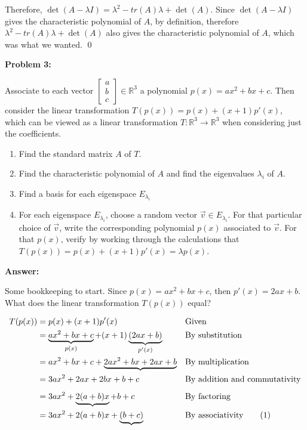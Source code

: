 \documentclass[10pt,letterpaper,final]{report}
\newcommand{\reason}[1]{&& \text{#1}}
\begin{document}
Therefore, $\det (A - \lambda I) = \lambda^2 - tr(A) \lambda + \det(A)$. Since $\det (A - \lambda I)$ gives the characteristic polynomial of $A$, by definition, therefore $\lambda^2 - tr(A) \lambda + \det(A)$ also gives the characteristic polynomial of $A$, which was what we wanted. \qed


\pagebreak

\noindent\textbf{Problem 3:}
\medskip

Associate to each vector $\begin{bmatrix}a\\b\\c\end{bmatrix} \in \mathbb{R}^3$ a polynomial $p(x) = ax^2 + bx + c$. Then consider the linear transformation $T(p(x)) = p(x) + (x+1)p'(x)$, which can be viewed as a linear transformation $T : \mathbb{R}^3 \to \mathbb{R}^3$ when considering just the coefficients.

\begin{enumerate}[label=(\alph*)]
  \item Find the standard matrix $A$ of $T$.
  \item Find the characteristic polynomial of $A$ and find the eigenvalues $\lambda_i$ of $A$.
  \item Find a basis for each eigenspace $E_{\lambda_i}$
  \item For each eigenspace $E_{\lambda_i}$, choose a random vector $\vec{v} \in E_{\lambda_i}$. For that particular choice of $\vec{v}$, write the corresponding polynomial $p(x)$ associated to $\vec{v}$. For that $p(x)$, verify by working through the calculations that $T(p(x)) = p(x) + (x+1)p'(x) = \lambda p(x)$.
\end{enumerate}

\medskip
\noindent\textbf{Answer:}

Some bookkeeping to start. Since $p(x) = ax^2 + bx + c$, then $p'(x) = 2ax + b$. What does the linear transformation $T(p(x))$ equal?

\begin{align*}
  T(p(x)) & = p(x) + (x+1)p'(x) \reason{Given}                                                                                                \\
          & = \underbrace{ax^2 + bx + c}_{p(x)} + (x+1)\underbrace{(2ax + b)}_{p'(x)} \reason{By substitution}                                \\
          & = ax^2 + bx + c + \underbrace{2ax^2 + bx + 2ax + b} \reason{By multiplication}                                                    \\
          & = 3ax^2 + 2ax + 2bx + b + c \reason{By addition and commutativity}                                                                \\[1ex]
          & = 3ax^2 + \underbrace{2(a+b)x} + b + c \reason{By factoring}                                                                      \\
          & = 3ax^2 + 2(a+b)x + \underbrace{(b + c)} \reason{By associativity} \refstepcounter{equation} \tag{\theequation} \label{eq:T-of-p}
\end{align*}
\end{document}
